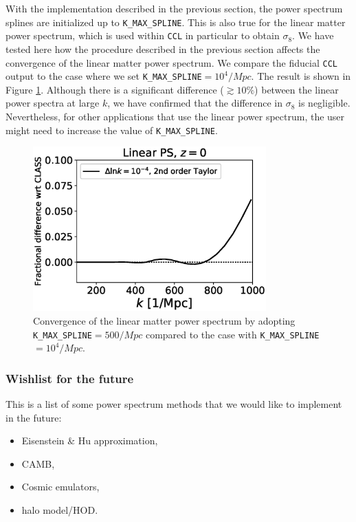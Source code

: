 \documentclass[\docopts]{\docclass}
\begin{document}
With the implementation described in the previous section, the power spectrum splines are initialized up to {\tt K\_MAX\_SPLINE}. This is also true for the linear matter power spectrum, which is used within {\tt CCL} in particular to obtain $\sigma_8$. We have tested here how the procedure described in the previous section affects the convergence of the linear matter power spectrum. We compare the fiducial {\tt CCL} output to the case where we set {\tt K\_MAX\_SPLINE}$=10^4/Mpc$. The result is shown in Figure \ref{fig:plinconv}. Although there is a significant difference ($\gtrsim 10\%$) between the linear power spectra at large $k$, we have confirmed that the difference in $\sigma_8$ is negligible. Nevertheless, for other applications that use the linear power spectrum, the user might need to increase the value of {\tt K\_MAX\_SPLINE}.

\begin{figure}
\centering
\includegraphics[width=0.8\textwidth]{figures/test_lin_extrapol.eps}
\caption{Convergence of the linear matter power spectrum by adopting {\tt K\_MAX\_SPLINE}$=500/Mpc$ compared to the case with {\tt K\_MAX\_SPLINE}$=10^4/Mpc$.}
\label{fig:plinconv}
\end{figure}

\subsubsection{Wishlist for the future}
\label{Pk_whishlist}
This is a list of some power spectrum methods that we would like to implement in the future:
\begin{itemize}
 \item Eisenstein \& Hu approximation,
 \item CAMB,
 \item Cosmic emulators,
 \item halo model/HOD.
\end{itemize}
\end{document}

